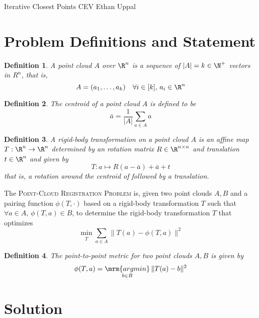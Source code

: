 \documentclass[12pt]{article}
\theoremstyle{defstyle}
\newtheorem{defn}{Definition}
\begin{document}
\begin{generic}
    Iterative Closest Points \hfill CEV \vbar Ethan Uppal
\end{generic}

\section{Problem Definitions and Statement}

\begin{defn}
    A \emph{point cloud} $A$ over $\R^n$ is a sequence of $|A| = k \in \N^+$ vectors in $R^n$, that is,
    \[
        A = (a_1, \dots, a_k) \quad \forall i \in [k],\, a_i \in \R^n
    \]
\end{defn}

\begin{defn}
    The \emph{centroid} of a point cloud $A$ is defined to be
    \[
        \bar{a} = \frac{1}{|A|} \sum_{a \in A} a
    \]
\end{defn}

\begin{defn}
    A \emph{rigid-body transformation} on a point cloud $A$ is an affine map $T : \R^n \to \R^n$ determined by an rotation matrix $R \in \R^{n \times n}$ and translation $t \in \R^n$ and given by
    \[
        T : a \mapsto R(a - \bar{a}) + \bar{a} + t
    \]
    that is, a rotation around the centroid of followed by a translation.
\end{defn}

\begin{outline}
    The \textsc{Point-Cloud Registration Problem} is, given two point clouds $A, B$ and a pairing function $\phi(T, \cdot)$ based on a rigid-body transformation $T$ such that $\forall a \in A,\, \phi(T, a) \in B$, to determine the rigid-body transformation $T$ that optimizes
    \begin{equation}\label{icp}
        \min\limits_{\substack{T}} \sum_{a \in A} \| T(a) - \phi(T, a) \|^2
    \end{equation}
\end{outline}

\begin{defn}
    The \emph{point-to-point metric} for two point clouds $A, B$ is given by
    \begin{equation}
        \phi(T, a) = \mathop{\mrm{argmin}}\limits_{\substack{b \in B}} \| T(a) - b \|^2
    \end{equation}
\end{defn}
\section{Solution}
\end{document}

